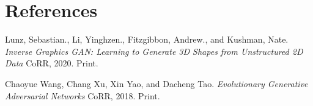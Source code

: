 \documentclass[11pt,letterpaper]{article}
\newcommand{\bibent}{\noindent \hangindent 40pt}
\newenvironment{reference}{\newpage \section*{References} }{\newpage }
\begin{document}
\begin{reference}
  \bibent
  Lunz, Sebastian., Li, Yinghzen., Fitzgibbon, Andrew., and Kushman, Nate. \textit{Inverse Graphics GAN: Learning to Generate 3D Shapes from Unstructured 2D Data} CoRR, 2020. Print.

  \bibent
  Chaoyue Wang, Chang Xu, Xin Yao, and Dacheng Tao. \textit{Evolutionary Generative Adversarial Networks} CoRR, 2018. Print.
\end{reference}
\end{document}
